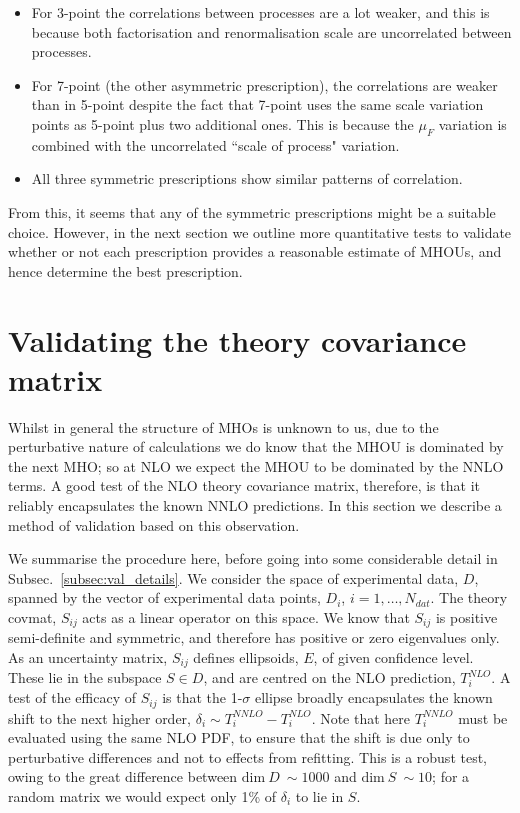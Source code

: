 \begin{itemize}
\item For 3-point the correlations between processes are a lot weaker, and this is because both factorisation and renormalisation scale are uncorrelated between processes.
\item For 7-point (the other asymmetric prescription), the correlations are weaker than in 5-point despite the fact that 7-point uses the same scale variation points as 5-point plus two additional ones. This is because the $\mu_F$ variation is combined with the uncorrelated ``scale of process" variation.
\item All three symmetric prescriptions show similar patterns of correlation.
\end{itemize}
From this, it seems that any of the symmetric prescriptions might be a suitable choice. However, in the next section we outline more quantitative tests to validate whether or not each prescription provides a reasonable estimate of MHOUs, and hence determine the best prescription. 

\section{Validating the theory covariance matrix}
\label{sec:valid}
Whilst in general the structure of MHOs is unknown to us, due to the perturbative nature of calculations we do know that the MHOU is dominated by the next MHO; so at NLO we expect the MHOU to be dominated by the NNLO terms. A good test of the NLO theory covariance matrix, therefore, is that it reliably encapsulates the known NNLO predictions. In this section we describe a method of validation based on this observation.

We summarise the procedure here, before going into some considerable detail in Subsec.~\ref{subsec:val_details}. We consider the space of experimental data, $D$, spanned by the vector of experimental data points, $D_i$, $i=1,\dots, N_{dat}$. The theory covmat, $S_{ij}$ acts as a linear operator on this space. We know that $S_{ij}$ is positive semi-definite and symmetric, and therefore has positive or zero eigenvalues only. As an uncertainty matrix, $S_{ij}$ defines ellipsoids, $E$, of given confidence level. These lie in the subspace $S \in D$, and are centred on the NLO prediction, $T_i^{NLO}$. A test of the efficacy of $S_{ij}$ is that the 1-$\sigma$ ellipse broadly encapsulates the known shift to the next higher order, $\delta_i \sim T_i^{NNLO} - T_i^{NLO}$. Note that here $T_i^{NNLO}$ must be evaluated using the same NLO PDF, to ensure that the shift is due only to perturbative differences and not to effects from refitting. This is a robust test, owing to the great difference between $\text{dim}\ D\ \sim 1000$ and $\text{dim}\ S\ \sim 10$; for a random matrix we would expect only 1\% of $\delta_i$ to lie in $S$. 

